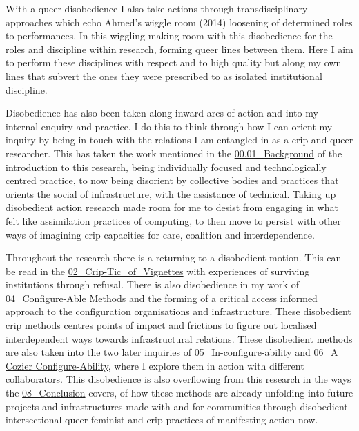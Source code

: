 With a queer disobedience I also take actions through transdisciplinary
approaches which echo Ahmed's wiggle room (2014) loosening of determined
roles to performances. In this wiggling making room with this
disobedience for the roles and discipline within research, forming queer
lines between them. Here I aim to perform these disciplines with respect
and to high quality but along my own lines that subvert the ones they
were prescribed to as isolated institutional discipline.

Disobedience has also been taken along inward arcs of action and into my
internal enquiry and practice. I do this to think through how I can
orient my inquiry by being in touch with the relations I am entangled in
as a crip and queer researcher. This has taken the work mentioned in the
\href{../../00_Introduction/sections/00.01_Background.md}{00.01\_Background}
of the introduction to this research, being individually focused and
technologically centred practice, to now being disorient by collective
bodies and practices that orients the social of infrastructure, with the
assistance of technical. Taking up disobedient action research made room
for me to desist from engaging in what felt like assimilation practices
of computing, to then move to persist with other ways of imagining crip
capacities for care, coalition and interdependence.

Throughout the research there is a returning to a disobedient motion.
This can be read in the
\href{../../02_Crip-Tic_of_Vignettes/02_Crip-Tic_of_Vignettes.md}{02\_Crip-Tic\_of\_Vignettes}
with experiences of surviving institutions through refusal. There is
also disobedience in my work of
\href{../../04_Configure-able_Methods/04_Configure-Able\%20Methods.md}{04\_Configure-Able
Methods} and the forming of a critical access informed approach to the
configuration organisations and infrastructure. These disobedient crip
methods centres points of impact and frictions to figure out localised
interdependent ways towards infrastructural relations. These disobedient
methods are also taken into the two later inquiries of
\href{../../05_In-Configure-Ability/05_In-configure-ability.md}{05\_In-configure-ability}
and
\href{../../06_A\%20Cozier\%20Configure-Ability/06_A\%20Cozier\%20Configure-Ability.md}{06\_A
Cozier Configure-Ability}, where I explore them in action with different
collaborators. This disobedience is also overflowing from this research
in the ways the
\href{../../08_Conclusion/08_Conclusion.md}{08\_Conclusion} covers, of
how these methods are already unfolding into future projects and
infrastructures made with and for communities through disobedient
intersectional queer feminist and crip practices of manifesting action
now.

